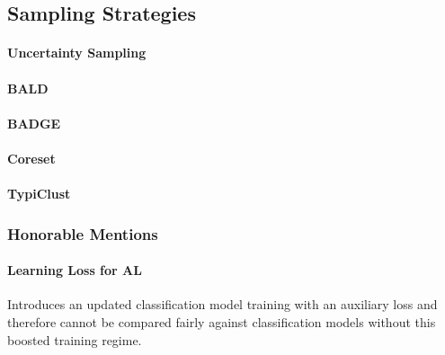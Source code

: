 \documentclass[]{article}
\begin{document}
\subsection{Sampling Strategies}\label{sec:sampling_strategies}
\paragraph{Uncertainty Sampling}
\paragraph{BALD}
\paragraph{BADGE}
\paragraph{Coreset}
\paragraph{TypiClust}
%
\subsubsection{Honorable Mentions}
\paragraph{Learning Loss for AL}
Introduces an updated classification model training with an auxiliary loss and therefore cannot be compared fairly against classification models without this boosted training regime.

\end{document}
